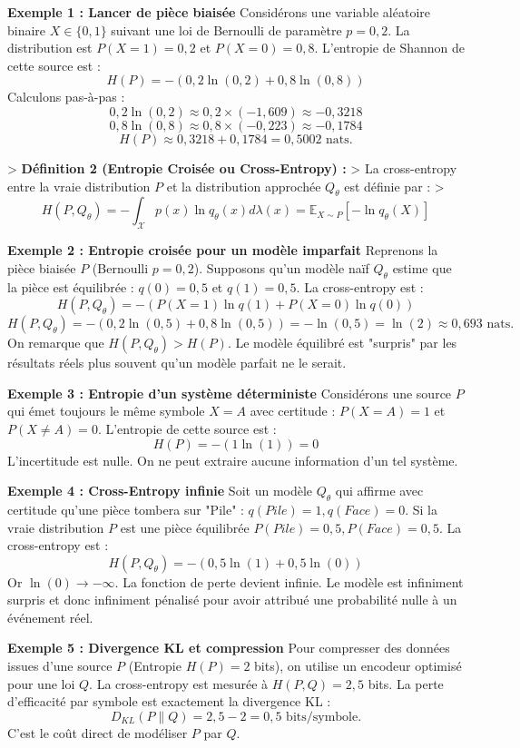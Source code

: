 \documentclass[11pt,a4paper]{article}
\begin{document}
\textbf{Exemple 1 : Lancer de pièce biaisée}
Considérons une variable aléatoire binaire $X \in \{0, 1\}$ suivant une loi de Bernoulli de paramètre $p=0,2$.
La distribution est $P(X=1) = 0,2$ et $P(X=0) = 0,8$.
L'entropie de Shannon de cette source est :
$$H(P) = - (0,2 \ln(0,2) + 0,8 \ln(0,8))$$
Calculons pas-à-pas :
$$0,2 \ln(0,2) \approx 0,2 \times (-1,609) \approx -0,3218$$
$$0,8 \ln(0,8) \approx 0,8 \times (-0,223) \approx -0,1784$$
$$H(P) \approx 0,3218 + 0,1784 = 0,5002 \text{ nats}.$$

> \textbf{Définition 2 (Entropie Croisée ou Cross-Entropy) :}
> La cross-entropy entre la vraie distribution $P$ et la distribution approchée $Q_\theta$ est définie par :
> $$H(P, Q_\theta) = - \int_{\mathcal{X}} p(x) \ln q_\theta(x) d\lambda(x) = \mathbb{E}_{X \sim P}[-\ln q_\theta(X)]$$

\textbf{Exemple 2 : Entropie croisée pour un modèle imparfait}
Reprenons la pièce biaisée $P$ (Bernoulli $p=0,2$).
Supposons qu'un modèle naïf $Q_\theta$ estime que la pièce est équilibrée : $q(0)=0,5$ et $q(1)=0,5$.
La cross-entropy est :
$$H(P, Q_\theta) = - (P(X=1) \ln q(1) + P(X=0) \ln q(0))$$
$$H(P, Q_\theta) = - (0,2 \ln(0,5) + 0,8 \ln(0,5)) = - \ln(0,5) = \ln(2) \approx 0,693 \text{ nats}.$$
On remarque que $H(P, Q_\theta) > H(P)$. Le modèle équilibré est "surpris" par les résultats réels plus souvent qu'un modèle parfait ne le serait.



\textbf{Exemple 3 : Entropie d'un système déterministe}
Considérons une source $P$ qui émet toujours le même symbole $X=A$ avec certitude : $P(X=A) = 1$ et $P(X \neq A) = 0$.
L'entropie de cette source est :
$$H(P) = - (1 \ln(1)) = 0$$
L'incertitude est nulle. On ne peut extraire aucune information d'un tel système.

\textbf{Exemple 4 : Cross-Entropy infinie}
Soit un modèle $Q_\theta$ qui affirme avec certitude qu'une pièce tombera sur "Pile" : $q(Pile)=1, q(Face)=0$.
Si la vraie distribution $P$ est une pièce équilibrée $P(Pile)=0,5, P(Face)=0,5$.
La cross-entropy est :
$$H(P, Q_\theta) = - (0,5 \ln(1) + 0,5 \ln(0))$$
Or $\ln(0) \to -\infty$. La fonction de perte devient infinie. Le modèle est infiniment surpris et donc infiniment pénalisé pour avoir attribué une probabilité nulle à un événement réel.

\textbf{Exemple 5 : Divergence KL et compression}
Pour compresser des données issues d'une source $P$ (Entropie $H(P) = 2$ bits), on utilise un encodeur optimisé pour une loi $Q$.
La cross-entropy est mesurée à $H(P, Q) = 2,5$ bits.
La perte d'efficacité par symbole est exactement la divergence KL :
$$D_{KL}(P \| Q) = 2,5 - 2 = 0,5 \text{ bits/symbole}.$$
C'est le coût direct de modéliser $P$ par $Q$.
\end{document}
